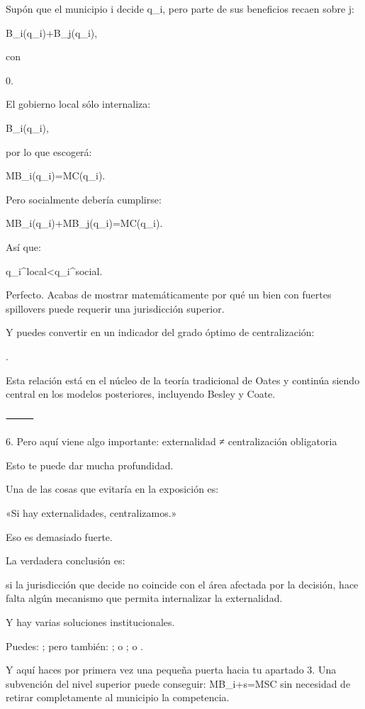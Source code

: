 \documentclass[10pt,a4paper]{article}
\begin{document}
Supón que el municipio i decide q_i, pero parte de sus beneficios recaen sobre j:

B_i(q_i)+\alpha B_j(q_i),

con

0\leq\alpha{}.

El gobierno local sólo internaliza:

B_i(q_i),

por lo que escogerá:

MB_i(q_i)=MC(q_i).

Pero socialmente debería cumplirse:

MB_i(q_i)+\alpha MB_j(q_i)=MC(q_i).

Así que:

q_i^{local}<q_i^{social}.

Perfecto. Acabas de mostrar matemáticamente por qué un bien con fuertes spillovers puede requerir una jurisdicción superior.

Y puedes convertir \alpha en un indicador del grado óptimo de centralización:

\alpha\uparrow
\quad\Longrightarrow\quad
{}.

Esta relación está en el núcleo de la teoría tradicional de Oates y continúa siendo central en los modelos posteriores, incluyendo Besley y Coate.  

⸻

6. Pero aquí viene algo importante: externalidad ≠ centralización obligatoria

Esto te puede dar mucha profundidad.

Una de las cosas que evitaría en la exposición es:

«Si hay externalidades, centralizamos.»

Eso es demasiado fuerte.

La verdadera conclusión es:

si la jurisdicción que decide no coincide con el área afectada por la decisión, hace falta algún mecanismo que permita internalizar la externalidad.

Y hay varias soluciones institucionales.

Puedes: ; pero también: ; o ; o .

Y aquí haces por primera vez una pequeña puerta hacia tu apartado 3. Una subvención del nivel superior puede conseguir: MB_i+s=MSC sin necesidad de retirar completamente al municipio la competencia.
\end{document}
